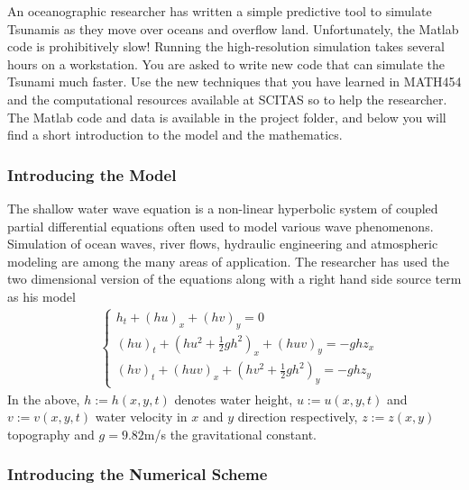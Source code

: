 \documentclass[10pt]{article}
\begin{document}
An oceanographic researcher has written a simple predictive tool to
simulate Tsunamis as they move over oceans and overflow land. Unfortunately,
the Matlab code is prohibitively slow! Running the high-resolution
simulation takes several hours on a workstation. You are asked to
write new code that can simulate the Tsunami much faster. Use the
new techniques that you have learned in MATH454 and the computational
resources available at SCITAS so to help the researcher. The Matlab
code and data is available in the project folder, and below you will
find a short introduction to the model and the mathematics. 

\subsubsection*{Introducing the Model}

The shallow water wave equation is a non-linear hyperbolic system
of coupled partial differential equations often used to model various
wave phenomenons. Simulation of ocean waves, river flows, hydraulic
engineering and atmospheric modeling are among the many areas of application.
The researcher has used the two dimensional version of the equations
along with a right hand side source term as his model
\begin{align*}
 & \begin{cases}
h_{t}+\left(hu\right)_{x}+\left(hv\right)_{y}=0\\
\left(hu\right)_{t}+\left(hu^{2}+\frac{1}{2}gh^{2}\right)_{x}+\left(huv\right)_{y}=-ghz_{x}\\
\left(hv\right)_{t}+\left(huv\right)_{x}+\left(hv^{2}+\frac{1}{2}gh^{2}\right)_{y}=-ghz_{y}
\end{cases}
\end{align*}
In the above, $h:=h\left(x,y,t\right)$ denotes water height, $u:=u\left(x,y,t\right)$
and $v:=v\left(x,y,t\right)$ water velocity in $x$ and $y$ direction
respectively, $z:=z\left(x,y\right)$ topography and $g=9.82$m/s\texttwosuperior{}
the gravitational constant. 

\subsubsection*{Introducing the Numerical Scheme}
\end{document}
